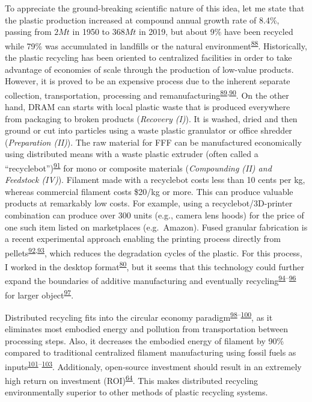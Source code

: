 \documentclass[
  12pt,
  a4paperpaper,
  onecolumn]{article}
\begin{document}
To appreciate the ground-breaking scientific nature of this idea, let me
state that the plastic production increased at compound annual growth
rate of 8.4\%, passing from \(2Mt\) in 1950 to \(368Mt\) in 2019, but
about 9\% have been recycled while 79\% was accumulated in landfills or
the natural
environment\textsuperscript{\protect\hyperlink{ref-Geyer2017}{88}}.
Historically, the plastic recycling has been oriented to centralized
facilities in order to take advantage of economies of scale through the
production of low-value products. However, it is proved to be an
expensive process due to the inherent separate collection,
transportation, processing and
remanufacturing\textsuperscript{\protect\hyperlink{ref-Hopewell2009}{89},\protect\hyperlink{ref-Singh2017b}{90}}.
On the other hand, DRAM can starts with local plastic waste that is
produced everywhere from packaging to broken products (\emph{Recovery
(I)}). It is washed, dried and then ground or cut into particles using a
waste plastic granulator or office shredder (\emph{Preparation (II)}).
The raw material for FFF can be manufactured economically using
distributed means with a waste plastic extruder (often called a
``recyclebot'')\textsuperscript{\protect\hyperlink{ref-Baechler2013}{91}}
for mono or composite materials (\emph{Compounding (II) and Feedstock
(IV)}). Filament made with a recyclebot costs less than 10 cents per kg,
whereas commercial filament costs \$20/kg or more. This can produce
valuable products at remarkably low costs. For example, using a
recyclebot/3D-printer combination can produce over 300 units (e.g.,
camera lens hoods) for the price of one such item listed on marketplaces
(e.g.~Amazon). Fused granular fabrication is a recent experimental
approach enabling the printing process directly from
pellets\textsuperscript{\protect\hyperlink{ref-JustinoNetto2021}{92},\protect\hyperlink{ref-netto2022}{93}},
which reduces the degradation cycles of the plastic. For this process, I
worked in the desktop
format\textsuperscript{\protect\hyperlink{ref-Arthur2020}{80}}, but it
seems that this technology could further expand the boundaries of
additive manufacturing and eventually
recycling\textsuperscript{\protect\hyperlink{ref-billah2021}{94}--\protect\hyperlink{ref-Byard2019}{96}}
for larger
object\textsuperscript{\protect\hyperlink{ref-petsiuk2022}{97}}.

Distributed recycling fits into the circular economy
paradigm\textsuperscript{\protect\hyperlink{ref-Zhong2018}{98}--\protect\hyperlink{ref-Despeisse2016}{100}},
as it eliminates most embodied energy and pollution from transportation
between processing steps. Also, it decreases the embodied energy of
filament by 90\% compared to traditional centralized filament
manufacturing using fossil fuels as
inputs\textsuperscript{\protect\hyperlink{ref-Kreiger2013}{101}--\protect\hyperlink{ref-Horta2017}{103}}.
Additionaly, open-source investment should result in an extremely high
return on investment
(ROI)\textsuperscript{\protect\hyperlink{ref-Pearce2020a}{64}}. This
makes distributed recycling environmentally superior to other methods of
plastic recycling systems.
\end{document}
